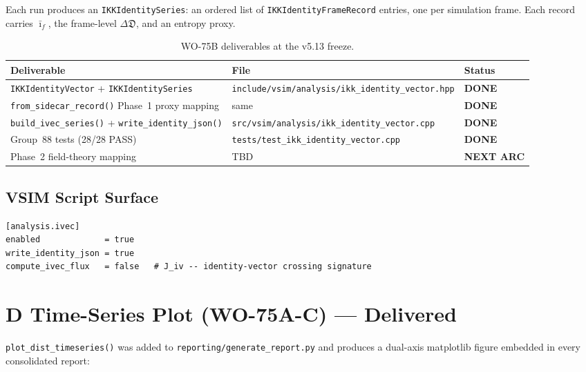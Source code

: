 \documentclass[11pt,a4paper]{article}
\theoremstyle{definition}
\newcommand{\Dfrak}{\mathfrak{D}}
\newcommand{\DeltaD}{\Delta\Dfrak}
\newcommand{\ivec}{\bar{\imath}_f}
\begin{document}
Each run produces an \texttt{IKKIdentitySeries}: an ordered list of
\texttt{IKKIdentityFrameRecord} entries, one per simulation frame.
Each record carries $\ivec$, the frame-level $\DeltaD$, and an entropy proxy.

\begin{table}[H]
\centering\small
\begin{tabular}{@{}lll@{}}
\toprule
Deliverable & File & Status \\
\midrule
\texttt{IKKIdentityVector} + \texttt{IKKIdentitySeries}
  & \texttt{include/vsim/analysis/ikk\_identity\_vector.hpp}
  & \textcolor{vsimgreen}{\textbf{DONE}} \\
\texttt{from\_sidecar\_record()} Phase~1 proxy mapping
  & same
  & \textcolor{vsimgreen}{\textbf{DONE}} \\
\texttt{build\_ivec\_series()} + \texttt{write\_identity\_json()}
  & \texttt{src/vsim/analysis/ikk\_identity\_vector.cpp}
  & \textcolor{vsimgreen}{\textbf{DONE}} \\
Group~88 tests (28/28 PASS)
  & \texttt{tests/test\_ikk\_identity\_vector.cpp}
  & \textcolor{vsimgreen}{\textbf{DONE}} \\
\midrule
Phase~2 field-theory mapping
  & TBD
  & \textcolor{vsimamber}{\textbf{NEXT ARC}} \\
\bottomrule
\end{tabular}
\caption{WO-75B deliverables at the v5.13 freeze.}
\end{table}

\subsection{VSIM Script Surface}

\begin{lstlisting}[style=eventprint,
  caption={\texttt{[analysis.ivec]} block in a \texttt{.vsim} script.}]
[analysis.ivec]
enabled             = true
write_identity_json = true
compute_ivec_flux   = false   # J_iv -- identity-vector crossing signature
\end{lstlisting}

\section{D Time-Series Plot (WO-75A-C) --- Delivered}

\texttt{plot\_dist\_timeseries()} was added to
\texttt{reporting/generate\_report.py} and produces a dual-axis matplotlib
figure embedded in every consolidated report:
\end{document}
